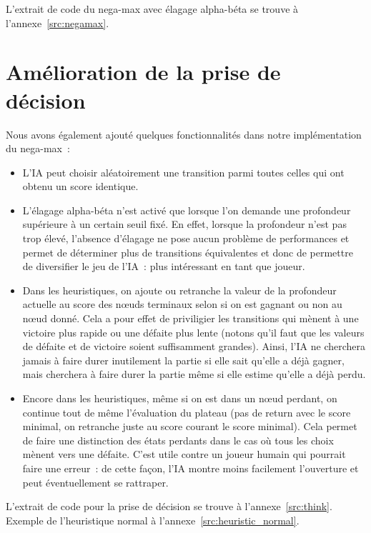 L'extrait de code du nega-max avec élagage alpha-béta se trouve à l'annexe \ref{src:negamax}.

\section{Amélioration de la prise de décision}

Nous avons également ajouté quelques fonctionnalités dans notre implémentation du nega-max :

\begin{itemize}
    \item L'IA peut choisir aléatoirement une transition parmi toutes celles qui ont obtenu un score identique.
    \item L'élagage alpha-béta n'est activé que lorsque l'on demande une profondeur supérieure à un certain seuil fixé.
        En effet, lorsque la profondeur n'est pas trop élevé, l'absence d'élagage ne pose aucun problème de performances et
        permet de déterminer plus de transitions équivalentes et donc de permettre de diversifier le jeu de l'IA : plus
        intéressant en tant que joueur.
    \item Dans les heuristiques, on ajoute ou retranche la valeur de la profondeur actuelle au score des nœuds terminaux selon
        si on est gagnant ou non au nœud donné. Cela a pour effet de priviligier les transitions qui mènent à une victoire plus
        rapide ou une défaite plus lente (notons qu'il faut que les valeurs de défaite et de victoire soient suffisamment
        grandes).
        Ainsi, l'IA ne cherchera jamais à faire durer inutilement la partie si elle sait qu'elle a déjà gagner, mais cherchera
        à faire durer la partie même si elle estime qu'elle a déjà perdu.
    \item Encore dans les heuristiques, même si on est dans un nœud perdant, on continue tout de même l'évaluation du plateau
        (pas de return avec le score minimal, on retranche juste au score courant le score minimal). Cela permet de faire
        une distinction des états perdants dans le cas où tous les choix mènent vers une défaite. C'est utile contre un joueur
        humain qui pourrait faire une erreur : de cette façon, l'IA montre moins facilement l'ouverture et peut éventuellement se
        rattraper.
\end{itemize}

L'extrait de code pour la prise de décision se trouve à l'annexe \ref{src:think}.
Exemple de l'heuristique normal à l'annexe \ref{src:heuristic_normal}.

